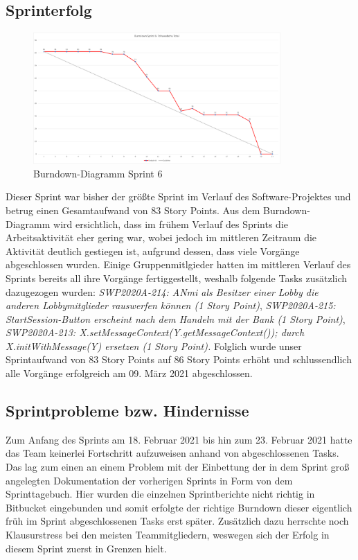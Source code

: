 \documentclass[12pt,a4paper, oneside]{article}
\begin{document}
\subsection{Sprinterfolg}
\begin{figure}[h]
    \centering
    \includegraphics[width=\textwidth, height=5cm]{../img/sprint_06/Burndown-Sprint6.png}
    \caption{Burndown-Diagramm Sprint 6}
    \label{fig: Burndown-Sprint6}
\end{figure}
\noindent
Dieser Sprint war bisher der größte Sprint im Verlauf des Software-Projektes und betrug einen Gesamtaufwand von 83 Story Points. Aus dem Burndown-Diagramm wird ersichtlich, dass im frühem Verlauf des Sprints die Arbeitsaktivität eher gering war, wobei jedoch im mittleren Zeitraum die Aktivität deutlich gestiegen ist, aufgrund dessen, dass viele Vorgänge abgeschlossen wurden. Einige Gruppenmitlgieder hatten im mittleren Verlauf des Sprints bereits all ihre Vorgänge fertiggestellt, weshalb folgende Tasks zusätzlich dazugezogen wurden: \textit{SWP2020A-214: ANmi als Besitzer einer Lobby die anderen Lobbymitglieder rauswerfen können (1 Story Point)}, \textit{SWP2020A-215: StartSession-Button erscheint nach dem Handeln mit der Bank (1 Story Point)}, 
\textit{SWP2020A-213: X.setMessageContext(Y.getMessageContext()); durch X.initWithMessage(Y) ersetzen (1 Story Point).} Folglich wurde unser Sprintaufwand von 83 Story Points auf 86 Story Points erhöht und schlussendlich alle Vorgänge erfolgreich am 09. März 2021 abgeschlossen. 

\subsection{Sprintprobleme bzw. Hindernisse}
Zum Anfang des Sprints am 18. Februar 2021 bis hin zum 23. Februar 2021 hatte das Team keinerlei Fortschritt aufzuweisen anhand von abgeschlossenen Tasks. Das lag zum einen an einem Problem mit der Einbettung der in dem Sprint groß angelegten Dokumentation der vorherigen Sprints in Form von dem Sprinttagebuch. Hier wurden die einzelnen Sprintberichte nicht richtig in Bitbucket eingebunden und somit erfolgte der richtige Burndown dieser eigentlich früh im Sprint abgeschlossenen Tasks erst später. Zusätzlich dazu herrschte noch Klausurstress bei den meisten Teammitgliedern, weswegen sich der Erfolg in diesem Sprint zuerst in Grenzen hielt.
\end{document}
